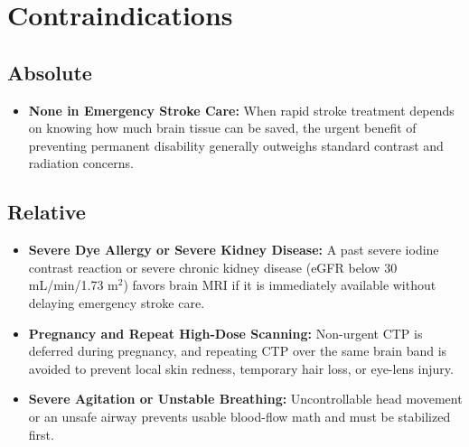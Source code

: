 \section{Contraindications}

\subsection{Absolute}
\begin{itemize}
    \item \textbf{None in Emergency Stroke Care:} When rapid stroke treatment depends on knowing how much brain tissue can be saved, the urgent benefit of preventing permanent disability generally outweighs standard contrast and radiation concerns.
\end{itemize}

\subsection{Relative}
\begin{itemize}
    \item \textbf{Severe Dye Allergy or Severe Kidney Disease:} A past severe iodine contrast reaction or severe chronic kidney disease (eGFR below 30 mL/min/1.73 m$^2$) favors brain MRI if it is immediately available without delaying emergency stroke care.
    \item \textbf{Pregnancy and Repeat High-Dose Scanning:} Non-urgent CTP is deferred during pregnancy, and repeating CTP over the same brain band is avoided to prevent local skin redness, temporary hair loss, or eye-lens injury.
    \item \textbf{Severe Agitation or Unstable Breathing:} Uncontrollable head movement or an unsafe airway prevents usable blood-flow math and must be stabilized first.
\end{itemize}

